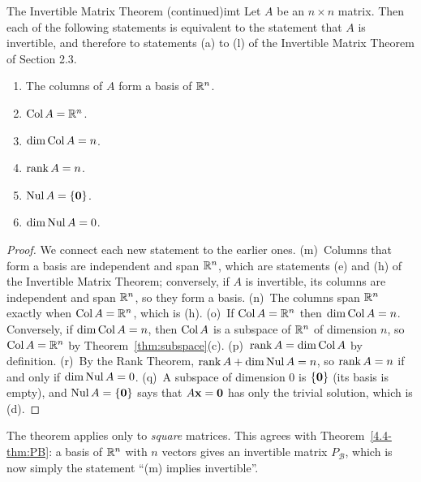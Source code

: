 \documentclass[11pt]{article}
\begin{document}
\begin{thm}{The Invertible Matrix Theorem (continued)}{imt}
Let $A$ be an $n\times n$ matrix. Then each of the following statements is equivalent to the statement that $A$ is invertible, and therefore to statements (a) to (l) of the Invertible Matrix Theorem of Section 2.3.
\begin{enumerate}[label=(\alph*),start=13,itemsep=1pt]
  \item The columns of $A$ form a basis of $\mathbb{R}^n$.
  \item $\operatorname{Col} A=\mathbb{R}^n$.
  \item $\dim\operatorname{Col} A=n$.
  \item $\operatorname{rank} A=n$.
  \item $\operatorname{Nul} A=\{\mathbf{0}\}$.
  \item $\dim\operatorname{Nul} A=0$.
\end{enumerate}
\end{thm}

\begin{proof}
We connect each new statement to the earlier ones. (m)~Columns that form a basis are independent and span $\mathbb{R}^n$, which are statements (e) and (h) of the Invertible Matrix Theorem; conversely, if $A$ is invertible, its columns are independent and span $\mathbb{R}^n$, so they form a basis. (n)~The columns span $\mathbb{R}^n$ exactly when $\operatorname{Col} A=\mathbb{R}^n$, which is (h). (o)~If $\operatorname{Col} A=\mathbb{R}^n$ then $\dim\operatorname{Col} A=n$. Conversely, if $\dim\operatorname{Col} A=n$, then $\operatorname{Col} A$ is a subspace of $\mathbb{R}^n$ of dimension $n$, so $\operatorname{Col} A=\mathbb{R}^n$ by Theorem~\ref{thm:subspace}(c). (p)~$\operatorname{rank} A=\dim\operatorname{Col} A$ by definition. (r)~By the Rank Theorem, $\operatorname{rank} A+\dim\operatorname{Nul} A=n$, so $\operatorname{rank} A=n$ if and only if $\dim\operatorname{Nul} A=0$. (q)~A subspace of dimension $0$ is $\{\mathbf{0}\}$ (its basis is empty), and $\operatorname{Nul} A=\{\mathbf{0}\}$ says that $A\mathbf{x}=\mathbf{0}$ has only the trivial solution, which is (d).
\end{proof}

The theorem applies only to \emph{square} matrices. This agrees with Theorem~\ref{4.4-thm:PB}: a basis of $\mathbb{R}^n$ with $n$ vectors gives an invertible matrix $P_{\mathcal{B}}$, which is now simply the statement ``(m) implies invertible''.
\end{document}
